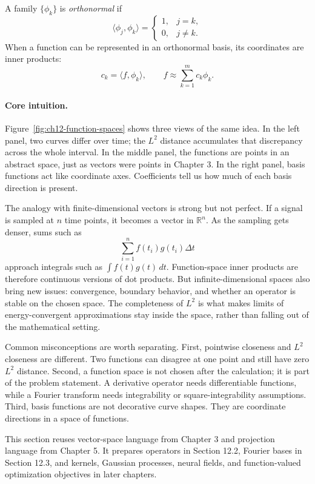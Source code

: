A family \(\{\phi_k\}\) is \emph{orthonormal} if
\[
\langle \phi_j,\phi_k\rangle
=
\begin{cases}
1, & j=k,\\
0, & j\neq k.
\end{cases}
\]
When a function can be represented in an orthonormal basis, its coordinates are inner products:
\[
c_k=\langle f,\phi_k\rangle,
\qquad
f\approx \sum_{k=1}^m c_k\phi_k.
\]

\paragraph{Core intuition.}
Figure~\ref{fig:ch12-function-spaces} shows three views of the same idea. In the left panel, two curves differ over time; the \(L^2\) distance accumulates that discrepancy across the whole interval. In the middle panel, the functions are points in an abstract space, just as vectors were points in Chapter 3. In the right panel, basis functions act like coordinate axes. Coefficients tell us how much of each basis direction is present.

The analogy with finite-dimensional vectors is strong but not perfect. If a signal is sampled at \(n\) time points, it becomes a vector in \(\mathbb{R}^n\). As the sampling gets denser, sums such as
\[
\sum_{i=1}^n f(t_i)g(t_i)\Delta t
\]
approach integrals such as \(\int f(t)g(t)\,dt\). Function-space inner products are therefore continuous versions of dot products. But infinite-dimensional spaces also bring new issues: convergence, boundary behavior, and whether an operator is stable on the chosen space. The completeness of \(L^2\) is what makes limits of energy-convergent approximations stay inside the space, rather than falling out of the mathematical setting.

Common misconceptions are worth separating. First, pointwise closeness and \(L^2\) closeness are different. Two functions can disagree at one point and still have zero \(L^2\) distance. Second, a function space is not chosen after the calculation; it is part of the problem statement. A derivative operator needs differentiable functions, while a Fourier transform needs integrability or square-integrability assumptions. Third, basis functions are not decorative curve shapes. They are coordinate directions in a space of functions.

This section reuses vector-space language from Chapter 3 and projection language from Chapter 5. It prepares operators in Section 12.2, Fourier bases in Section 12.3, and kernels, Gaussian processes, neural fields, and function-valued optimization objectives in later chapters.

